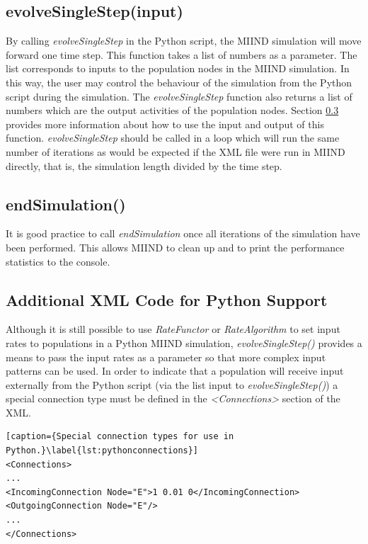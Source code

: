 \documentclass[utf8]{frontiersSCNS} %
\begin{document}
\subsection{evolveSingleStep(input)}
By calling \textit{evolveSingleStep} in the Python script, the MIIND simulation will move forward one time step. This function takes a list of numbers as a parameter. The list corresponds to inputs to the population nodes in the MIIND simulation. In this way, the user may control the behaviour of the simulation from the Python script during the simulation. The \textit{evolveSingleStep} function also returns a list of numbers which are the output activities of the population nodes. Section \ref{externalconnections} provides more information about how to use the input and output of this function. \textit{evolveSingleStep} should be called in a loop which will run the same number of iterations as would be expected if the XML file were run in MIIND directly, that is, the simulation length divided by the time step.

\subsection{endSimulation()}
It is good practice to call \textit{endSimulation} once all iterations of the simulation have been performed. This allows MIIND to clean up and to print the performance statistics to the console.

\subsection{Additional XML Code for Python Support}
\label{externalconnections}
Although it is still possible to use \textit{RateFunctor} or \textit{RateAlgorithm} to set input rates to populations in a Python MIIND simulation, \textit{evolveSingleStep()} provides a means to pass the input rates as a parameter so that more complex input patterns can be used. In order to indicate that a population will receive input externally from the Python script (via the list input to \textit{evolveSingleStep()}) a special connection type must be defined in the \textit{\textless Connections\textgreater} section of the XML.

\begin{lstlisting}[caption={Special connection types for use in Python.}\label{lst:pythonconnections}]
<Connections>
...
<IncomingConnection Node="E">1 0.01 0</IncomingConnection>
<OutgoingConnection Node="E"/>
...
</Connections>
\end{lstlisting}
\end{document}
